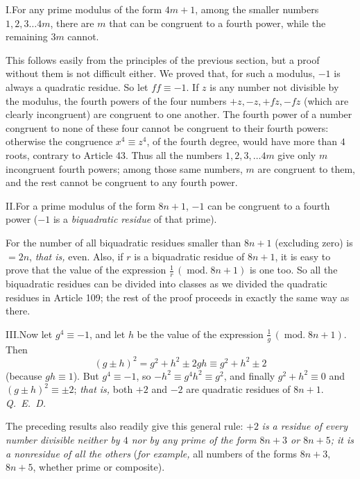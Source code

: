 I.\quad For any prime modulus of the form $4m+1$, among the smaller numbers $1,2,3\ldots4m$, there are $m$ that can be congruent to a fourth power, while the remaining $3m$ cannot.

This follows easily from the principles of the previous section, but a proof without them is not difficult either. We proved that, for such a modulus, $-1$ is always a quadratic residue. So let $ff\equiv-1$. If $z$ is any number not divisible by the modulus, the fourth powers of the four numbers $+z,-z,+fz,-fz$ (which are clearly incongruent) are congruent to one another. The fourth power of a number congruent to none of these four cannot be congruent to their fourth powers: otherwise the congruence $x^4\equiv z^4$, of the fourth degree, would have more than $4$ roots, contrary to Article 43. Thus all the numbers $1,2,3,\ldots4m$ give only $m$ incongruent fourth powers; among those same numbers, $m$ are congruent to them, and the rest cannot be congruent to any fourth power.

II.\quad For a prime modulus of the form $8n+1$, $-1$ can be congruent to a fourth power ($-1$ is a \emph{biquadratic residue} of that prime).

For the number of all biquadratic residues smaller than $8n+1$ (excluding zero) is $=2n$, \emph{that is,} even. Also, if $r$ is a biquadratic residue of $8n+1$, it is easy to prove that the value of the expression $\frac{1}{r}\,(\operatorname{mod.}8n+1)$ is one too. So all the biquadratic residues can be divided into classes as we divided the quadratic residues in Article 109; the rest of the proof proceeds in exactly the same way as there.

III.\quad Now let $g^4\equiv-1$, and let $h$ be the value of the expression $\frac{1}{g}\,(\operatorname{mod.}8n+1)$. Then
\[
(g\pm h)^2=g^2+h^2\pm2gh\equiv g^2+h^2\pm2
\]
(because $gh\equiv1$). But $g^4\equiv-1$, so $-h^2\equiv g^4h^2\equiv g^2$, and finally $g^2+h^2\equiv0$ and $(g\pm h)^2\equiv\pm2$; \emph{that is,} both $+2$ and $-2$ are quadratic residues of $8n+1$. \mbox{\emph{Q. E. D.}}

The preceding results also readily give this general rule: $+2$ \emph{is a residue of every number divisible neither by $4$ nor by any prime of the form $8n+3$ or $8n+5$; it is a nonresidue of all the others} (\emph{for example,} all numbers of the forms $8n+3$, $8n+5$, whether prime or composite).

